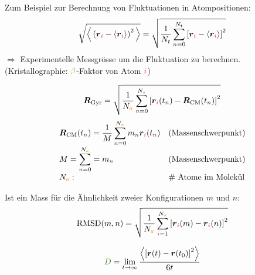 \begin{notebox}[Nützlichkeit]\nospacing
  Zum Beispiel zur Berechnung von Fluktuationen in Atompositionen:
  \begin{align*}
    \sqrt{\Big\langle\left(\rveci-\obs{\rveci}\right)^2\Big\rangle}=\sqrt{\frac{1}{N_t}\sum_{\idxn=0}^{N_t}\left[\rveci-\obs{\rveci}\right]^2}
  \end{align*}
  $\Rightarrow$ Experimentelle Messgrösse um die Fluktuation zu berechnen.\\
  (Kristallographie: $\betac$-Faktor von Atom $\idxi$)
\end{notebox}
\begin{sectionbox}\nospacing
  \begin{align*}
    \vec{R}_{\text{Gyr}}=\sqrt{\frac{1}{N_{\mca}}\sum_{\idxn=0}^{N_{\mca}}\left[\rveci(t_{\idxn})-\vec{R}_{\text{CM}}(t_{\idxn})\right]^2}
  \end{align*}
  \begin{align*}
  &\vec{R}_{\text{CM}}(t_{\idxn})=\frac{1}{M}\sum_{\idxn=0}^{N_{\mca}}m_{\idxn}\rveci(t_{\idxn}) &&\text{(Massenschwerpunkt)}\nalign
                                                                      &M=\sum_{\idxn=0}^{N_{\mca}}=m_{\idxn}&&\text{(Massenschwerpunkt)}\nalign
    &N_{\mca}:&&\text{\# Atome im Molekül}
  \end{align*}
\end{sectionbox}
\begin{sectionbox}\nospacing
  Ist ein Mass für die Ähnlichkeit zweier Konfigurationen $m$ und $n$:
  \begin{align*}
    \text{RMSD}(m,n)=\sqrt{\frac{1}{N_{\mca}}\sum_{\idxi=1}^{N_{\mca}}\left[\rveci(m)-\rveci(n)\right]^2}
  \end{align*}
\end{sectionbox}
\begin{sectionbox}\nospacing
  \begin{align*}
    \mcc[D]=\lim_{t\to\infty}\frac{\obs{\left[\rvec(t)-\rvec(t_0)\right]^2}}{6t}
  \end{align*}
\end{sectionbox}
